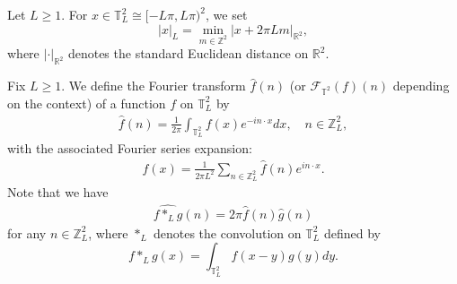 \documentclass[letterpaper, 11pt,  reqno]{amsart}
\theoremstyle{myremark}
\newcommand{\1}{\hspace{0.5mm}\text{I}\hspace{0.5mm}}
\newcommand{\Z}{\mathbb{Z}}
\newcommand{\R}{\mathbb{R}}
\newcommand{\T}{\mathbb{T}}
\newcommand{\F}{\mathcal{F}}
\newcommand{\be}{\beta}
\newcommand{\ft}{\widehat}
\renewcommand{\o}{\omega}
\renewcommand{\O}{\Omega}
\newcommand{\PP}{\mathbb{P}}
\DeclareMathOperator{\Law}{Law}
\numberwithin{equation}{section}
\numberwithin{theorem}{section}
\begin{document}
Let $L \ge 1$. For $x \in \T^2_L \cong [-L\pi, L\pi)^2$, 
we set
\[ |x |_{L} = \min_{m \in \Z^2} |x  + 2\pi L m|_{\R^2},\]
where $|\cdot |_{\R^2}$ denotes the standard Euclidean distance on $\R^2$.


%




Fix $L\ge 1$. We define the Fourier transform $\ft f(n)$ (or $\F_{\T^2}(f)(n)$ depending on the context) of a function $f$ on $\T^2_L$
by 
\begin{align}
\ft f(n) %
= \frac{1}{2\pi} \int_{\T^2_L} f(x) e^{-i n \cdot x} dx, \quad n \in \Z^2_L, 
\label{FT1}
\end{align}
with the associated Fourier series expansion:
\begin{align*}
f(x) = \frac{1}{2\pi L^2} \sum_{n \in \Z_L^2} \ft f(n)e^{i n \cdot x}.
\end{align*}
Note that we have
\begin{align}
\ft {f*_Lg}(n) = 2\pi  \ft f(n) \ft g(n)
\label{FT3}
\end{align}
for any $n \in \Z_L^2$, where $*_L$ denotes the convolution on $\T^2_L$
defined by 
\[ f*_Lg(x) = \int_{\T^2_L}f(x - y) g(y) dy .\]
\end{document}
